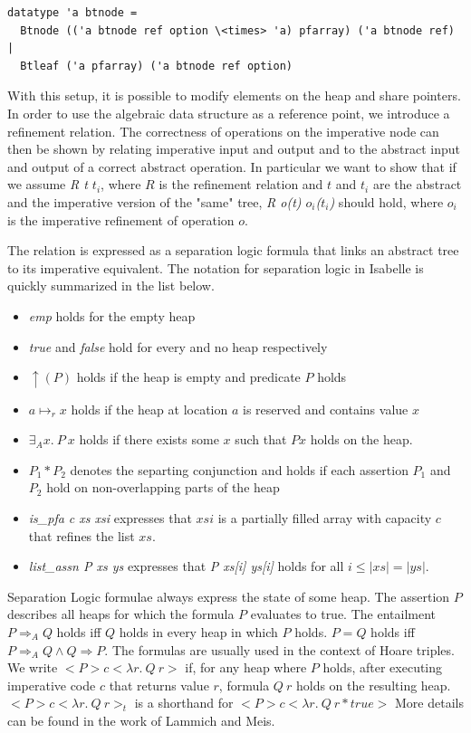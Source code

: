 \documentclass[a4paper,UKenglish,cleveref, autoref, thm-restate]{lipics-v2021}
\begin{document}
\begin{lstlisting}[mathescape=true, language=Isabelle,label=lst:btree-imp-def]
datatype 'a btnode =
  Btnode (('a btnode ref option \<times> 'a) pfarray) ('a btnode ref) |
  Btleaf ('a pfarray) ('a btnode ref option)
\end{lstlisting}

With this setup, it is possible to modify elements on the heap and share pointers.
In order to use the algebraic data structure as a reference point,
we introduce a refinement relation.
The correctness of operations on the imperative node
can then be shown by relating imperative input and output
and to the abstract input and output of a correct abstract operation.
In particular we want to show that if we assume \emph{R t $t_i$},
where $R$ is the refinement relation and $t$ and $t_i$ are the abstract
and the imperative version of the "same" tree,
\emph{R o(t) $o_i$($t_i$)} should hold, where $o_i$ is the imperative refinement
of operation $o$.

The relation is expressed as a separation logic formula that links an abstract tree to its
imperative equivalent.
The notation for separation logic in Isabelle is quickly summarized in the list below.
\begin{itemize}
    \item \textit{emp} holds for the empty heap
    \item \textit{true} and \textit{false} hold for every and no heap respectively
    \item $\uparrow(P)$ holds if the heap is empty and predicate $P$ holds
    \item $a \mapsto_r x$ holds if the heap at location $a$ is reserved and contains
    value $x$
    \item $\exists_A x.\ P\ x$ holds if there exists some $x$ such that $P x$
    holds on the heap.
    \item $P_1 * P_2$ denotes the separting conjunction and holds if each assertion $P_1$ and $P_2$ hold on non-overlapping parts
    of the heap
    \item \emph{is\_pfa c xs xsi} expresses that $xsi$ is a partially filled array
    with capacity $c$ that refines the list $xs$.
    \item \emph{list\_assn P xs ys} expresses that \emph{P xs[i] ys[i]} holds for all $i \leq |xs| = |ys|$.
\end{itemize}
Separation Logic formulae always express the state of some heap.
The assertion $P$ describes all heaps for which the formula $P$ evaluates to true.
The entailment $P \Longrightarrow_A Q$ holds iff $Q$ holds in every heap in which $P$ holds.
$P = Q$ holds iff $P \Longrightarrow_A Q \wedge Q \Longrightarrow P$.
The formulas are usually used in the context of Hoare triples.
We write $<P> c <\lambda r.\ Q\ r>$ if, for any heap where $P$ holds, after executing
imperative code $c$ that returns value $r$, formula $Q\ r$ holds on the resulting heap.
$<P> c <\lambda r.\ Q\ r>_t$ is a shorthand for $<P> c <\lambda r.\ Q\ r * \mathit{true}>$
More details can be found in the work of Lammich and Meis. \cite{DBLP:journals/afp/LammichM12}
\end{document}
